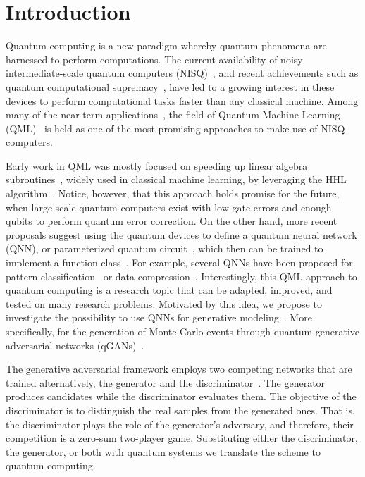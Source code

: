 \documentclass[twocolumn,preprintnumbers,superscriptaddress]{revtex4-2}
\begin{document}
\section{Introduction}

Quantum computing is a new paradigm whereby quantum phenomena are harnessed to
perform computations. The current availability of noisy intermediate-scale
quantum computers (NISQ)~\cite{nisq}, and recent achievements such as quantum
computational supremacy~\cite{supremacy, zhong2020quantum}, have led to a
growing interest in these devices to perform computational tasks faster than any
classical machine. Among many of the near-term
applications~\cite{cerezo2021variational, bharti2021noisy}, the field of Quantum
Machine Learning (QML)~\cite{biamonte2017quantum, schuld2018supervised} is held
as one of the most promising approaches to make use of NISQ computers.

Early work in QML was mostly focused on speeding up linear algebra
subroutines~\cite{wiebe2012quantum, lloyd:2013ml, Rebentrost:2014svm,
  kerenidis2020quantum}, widely used in classical machine learning, by leveraging
the HHL algorithm~\cite{harrow2009quantum}. Notice, however, that this approach holds
promise for the future, when large-scale quantum computers exist with low gate
errors and enough qubits to perform quantum error correction. On the other hand, more
recent proposals suggest using the quantum devices to define a quantum neural network (QNN), or parameterized
quantum circuit~\cite{benedetti2019parameterized, sim2019expressibility,
  bravo2020scaling}, which then can be trained to
implement a function class~\cite{schuld2021effect, goto2021universal,
  perez2021one}. For example, several QNNs have been proposed for pattern
classification~\cite{havlivcek2019supervised, Schuld:2020circuit,
  perezsalinas:2020reuploading, dutta2021realization} or data compression~\cite{romero2017quantum, pepper2019experimental,
  bravo2021quantum, cao2021noise}. Interestingly, this QML approach to quantum
computing is a research topic that can be adapted, improved, and tested on many
research problems. Motivated by this idea, we propose to investigate the
possibility to use QNNs for generative modeling~\cite{benedetti2019generative,
  hamilton2019generative, coyle2020born}. More specifically, for the generation of
Monte Carlo events through quantum generative adversarial networks
(qGANs)~\cite{dallaire2018quantum, lloyd2018quantum}.

The generative adversarial framework employs two competing networks that are
trained alternatively, the generator and the
discriminator~\cite{goodfellow2014generative}. The generator produces candidates
while the discriminator evaluates them. The objective of the discriminator is to
distinguish the real samples from the generated ones. That is, the discriminator
plays the role of the generator's adversary, and therefore, their competition is
a zero-sum two-player game. Substituting either the discriminator, the
generator, or both with quantum systems we translate the scheme to quantum
computing.
\end{document}
